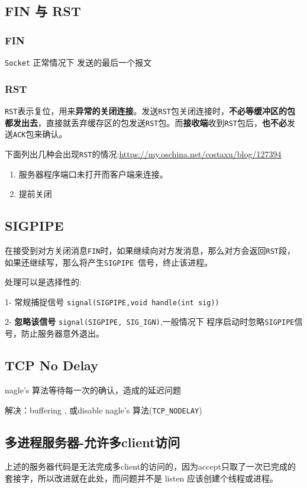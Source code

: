 \documentclass[UTF8,a4paper,8pt]{ctexbook}
\begin{document}
		\subsection{FIN 与 RST}
			\subsubsection{FIN}
				\verb|Socket| 正常情况下 发送的最后一个报文
				
			\subsubsection{RST}
				\verb|RST|表示复位，用来\textbf{异常的关闭连接}。发送\verb|RST|包关闭连接时，\textbf{不必等缓冲区的包都发出去}，直接就丢弃缓存区的包发送\verb|RST|包。而\textbf{接收端}收到\verb|RST|包后，\textbf{也不必}发送\verb|ACK|包来确认。
				
				下面列出几种会出现\verb|RST|的情况:\url{https://my.oschina.net/costaxu/blog/127394}
					\begin{enumerate}[itemindent = 1em]
						\item 服务器程序端口未打开而客户端来连接。
						\item 提前关闭
					\end{enumerate}
				
		\subsection{SIGPIPE}
			在接受到对方关闭消息\verb|FIN|时，如果继续向对方发消息，那么对方会返回\verb|RST|段，如果还继续写，那么将产生\verb|SIGPIPE |信号，终止该进程。
			
			处理可以是选择性的:
			
			1- 常规捕捉信号 \verb|signal(SIGPIPE,void handle(int sig))|
			
			2- \textbf{忽略该信号 }\verb|signal(SIGPIPE, SIG_IGN)|,一般情况下 程序启动时忽略\verb|SIGPIPE|信号，防止服务器意外退出。
		
		\subsection{TCP No Delay}
			nagle's 算法等待每一次的确认，造成的延迟问题
			
				解决：buffering , 或disable nagle's 算法(\verb|TCP_NODELAY|)
			
		\subsection{多进程服务器-允许多client访问}
			上述的服务器代码是无法完成多client的访问的，因为accept只取了一次已完成的套接字，所以改进就在此处，而问题并不是 listen 应该创建个线程或进程。
			
\end{document}
